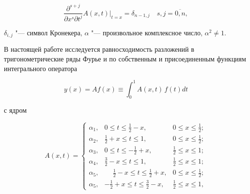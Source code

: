 $$

\frac{\partial^{s+j}}{\partial x^s \partial t^j}A(x,t)\Big|_{t=x}=\delta_{n-1,j}\quad s,j=\overline{0,n},

$$ 

$\delta_{i,j}$ "--- символ Кронекера, $\alpha$ "--- произвольное комплексное число, $\alpha^2\neq 1$. 



\smallskip



В настоящей работе исследуется равносходимость разложений в тригонометрические ряды Фурье и по собственным и присоединенным функциям интегрального оператора

\begin{equation}

\label{ved.3}

y(x)=  Af(x)\equiv \int_0^1 A(x,t)\,f(t)dt 

\end{equation}

с ядром

$$

A(x,t)= 

\left\{

\begin{array}{ccl}

\alpha_1,  & 0\leq t \leq \frac12 - x,  & 0\leq x \leq \frac12 ;\\[1mm]

\alpha_2,  & \frac12+x \leq t\leq 1,    & 0 \leq x \leq \frac12;\\[1mm] 

\alpha_3,  & 0\leq t \leq -\frac12 + x, & \frac12 \leq x \leq 1;\\[1mm]

\alpha_4,  & \frac32-x \leq t\leq 1,    & \frac12 \leq x \leq 1; \\[1mm]

\alpha_5,  & \phantom{-} \frac12-x \leq t\leq \frac12 + x, & 0 \leq x \leq \frac12;\\[1mm]

\alpha_5, & -\frac12+x \leq t\leq \frac32 - x, & \frac12 \leq x \leq 1 ,

\end{array}

\right.

$$



\noindent

